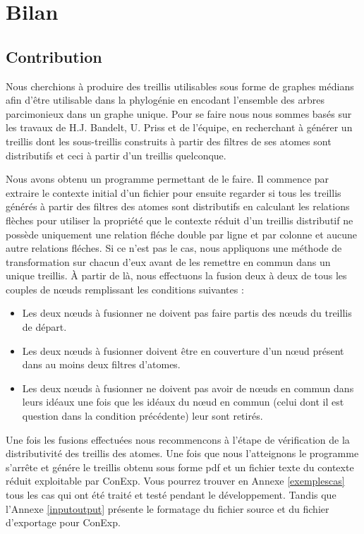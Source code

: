 \chapter{Bilan}

\section{Contribution}

Nous cherchions à produire des treillis utilisables sous forme de graphes médians afin d'être utilisable dans la phylogénie en encodant l'ensemble des arbres parcimonieux dans un graphe unique. Pour se faire nous nous sommes basés sur les travaux de H.J. Bandelt, U. Priss et de l'équipe, en recherchant à générer un treillis dont les sous-treillis construits à partir des filtres de ses atomes sont distributifs et ceci à partir d'un treillis quelconque.

\bigbreak

Nous avons obtenu un programme permettant de le faire. Il commence par extraire le contexte initial d'un fichier pour ensuite regarder si tous les treillis générés à partir des filtres des atomes sont distributifs en calculant les relations flèches pour utiliser la propriété que le contexte réduit d'un treillis distributif ne possède uniquement une relation fléche double par ligne et par colonne et aucune autre relations fléches. Si ce n'est pas le cas, nous appliquons une méthode de transformation sur chacun d'eux avant de les remettre en commun dans un unique treillis. À partir de là, nous effectuons la fusion deux à deux de tous les couples de n\oe uds remplissant les conditions suivantes :
\begin{itemize}
	\item Les deux n\oe uds à fusionner ne doivent pas faire partis des n\oe uds du treillis de départ.
	\item Les deux n\oe uds à fusionner doivent être en couverture d'un n\oe ud présent dans au moins deux filtres d'atomes.
	\item Les deux n\oe uds à fusionner ne doivent pas avoir de n\oe uds en commun dans leurs idéaux une fois que les idéaux du n\oe ud en commun (celui dont il est question dans la condition précédente) leur sont retirés.
\end{itemize}
Une fois les fusions effectuées nous recommencons à l'étape de vérification de la distributivité des treillis des atomes. Une fois que nous l'atteignons le programme s'arrête et génére le treillis obtenu sous forme pdf et un fichier texte du contexte réduit exploitable par ConExp. Vous pourrez trouver en Annexe \ref{exemplescas} tous les cas qui ont été traité et testé pendant le développement. Tandis que l'Annexe \ref{inputoutput} présente le formatage du fichier source et du fichier d'exportage pour ConExp.

